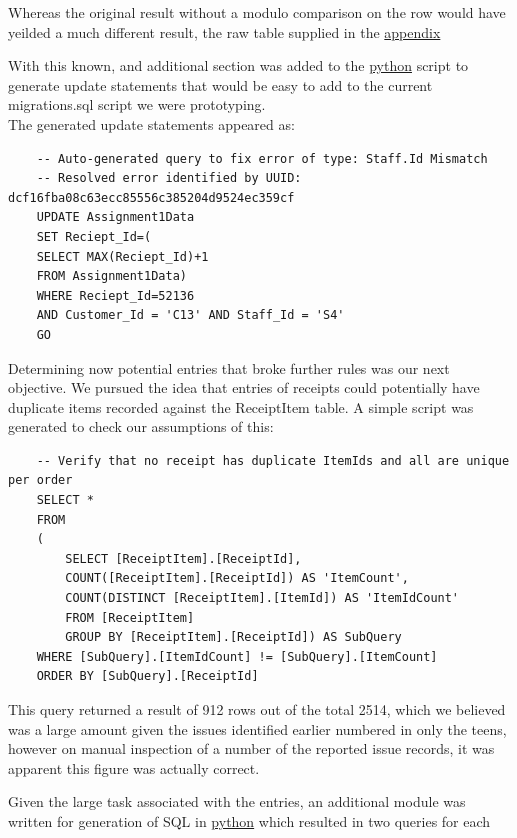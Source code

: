 \documentclass{article}
\newcounter{num}
\begin{document}
            Whereas the original result without a modulo comparison on the row would have yeilded
            a much different result, the raw table supplied in the \hyperref[sec:CTEResults]{\color{blue}appendix}
            \par
            With this known, and additional section was added to the \hyperref[sec:Python]{\color{blue}python} script to generate update statements
            that would be easy to add to the current migrations.sql script we were prototyping.
            \\
            The generated update statements appeared as:
            \begin{verbatim}
    -- Auto-generated query to fix error of type: Staff.Id Mismatch
    -- Resolved error identified by UUID: dcf16fba08c63ecc85556c385204d9524ec359cf
    UPDATE Assignment1Data 
    SET Reciept_Id=(
    SELECT MAX(Reciept_Id)+1 
    FROM Assignment1Data)
    WHERE Reciept_Id=52136
    AND Customer_Id = 'C13' AND Staff_Id = 'S4'
    GO
            \end{verbatim}
            Determining now potential entries that broke further rules was our next objective.
            We pursued the idea that entries of receipts could potentially have duplicate items
            recorded against the ReceiptItem table. A simple script was generated to check our 
            assumptions of this:
            \begin{verbatim}
    -- Verify that no receipt has duplicate ItemIds and all are unique per order
    SELECT *
    FROM
    (
        SELECT [ReceiptItem].[ReceiptId], 
        COUNT([ReceiptItem].[ReceiptId]) AS 'ItemCount',
        COUNT(DISTINCT [ReceiptItem].[ItemId]) AS 'ItemIdCount'
        FROM [ReceiptItem]
        GROUP BY [ReceiptItem].[ReceiptId]) AS SubQuery 
    WHERE [SubQuery].[ItemIdCount] != [SubQuery].[ItemCount]
    ORDER BY [SubQuery].[ReceiptId]
            \end{verbatim}
            This query returned a result of 912 rows out of the total 2514, which we believed 
            was a large amount given the issues identified earlier numbered in only the teens, 
            however on manual inspection of a number of the reported issue records, it was 
            apparent this figure was actually correct. 
            \par
            Given the large task associated with the entries, an additional module was
            written for generation of SQL in \hyperref[sec:Python]{\color{blue}python} which resulted in two queries for each
\end{document}
